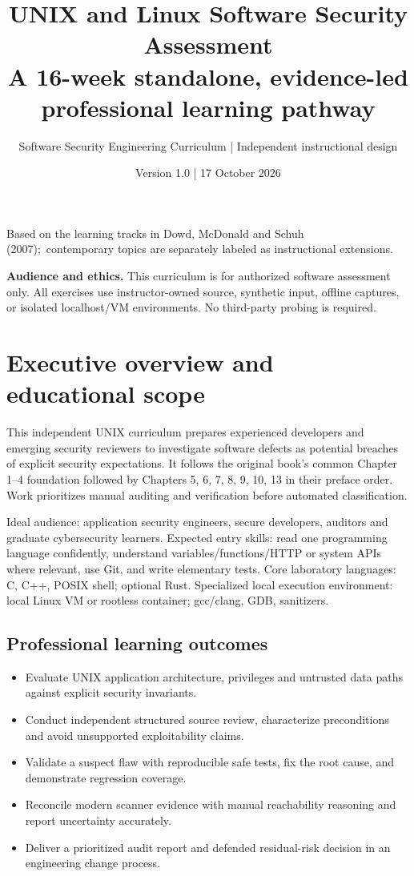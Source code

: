 \documentclass[10pt,letterpaper]{article}
\title{\vspace{-1.6cm}\Huge\color{navy}\bfseries UNIX and Linux Software Security Assessment\\[8pt]\large\color{teal}A 16-week standalone, evidence-led professional learning pathway}
\author{Software Security Engineering Curriculum | Independent instructional design}
\date{Version 1.0 | 17 October 2026}
\begin{document}
\maketitle
\begin{center}\small Based on the learning tracks in Dowd, McDonald and Schuh (2007);\
contemporary topics are separately labeled as instructional extensions.\end{center}
\begin{insight}\textbf{Audience and ethics.} This curriculum is for authorized software assessment only. All exercises use instructor-owned source, synthetic input, offline captures, or isolated localhost/VM environments. No third-party probing is required.\end{insight}
\tableofcontents
\clearpage
\section{Executive overview and educational scope}
This independent UNIX curriculum prepares experienced developers and emerging security reviewers to investigate software defects as potential breaches of explicit security expectations. It follows the original book's common Chapter 1--4 foundation followed by Chapters 5, 6, 7, 8, 9, 10, 13 in their preface order. Work prioritizes manual auditing and verification before automated classification.

Ideal audience: application security engineers, secure developers, auditors and graduate cybersecurity learners. Expected entry skills: read one programming language confidently, understand variables/functions/HTTP or system APIs where relevant, use Git, and write elementary tests. Core laboratory languages: C, C++, POSIX shell; optional Rust. Specialized local execution environment: local Linux VM or rootless container; gcc/clang, GDB, sanitizers.

\subsection{Professional learning outcomes}
\begin{itemize}[leftmargin=*,itemsep=2pt]
\item Evaluate UNIX application architecture, privileges and untrusted data paths against explicit security invariants.
\item Conduct independent structured source review, characterize preconditions and avoid unsupported exploitability claims.
\item Validate a suspect flaw with reproducible safe tests, fix the root cause, and demonstrate regression coverage.
\item Reconcile modern scanner evidence with manual reachability reasoning and report uncertainty accurately.
\item Deliver a prioritized audit report and defended residual-risk decision in an engineering change process.
\end{itemize}
\end{document}

